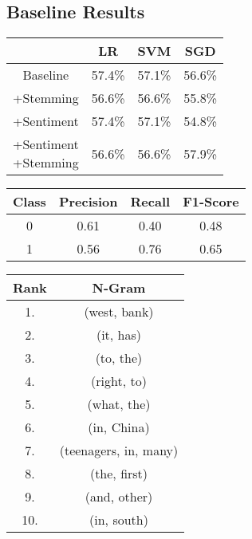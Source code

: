 \documentclass[11pt,a4paper]{article}
\begin{document}
\subsection{Baseline Results}
\begin{center}
\begin{tabular}{ |c|c|c|c| }
 \hline
  & LR & SVM & SGD \\
 \hline
 Baseline & 57.4\% & 57.1\% & 56.6\% \\
  \hline
 +Stemming & 56.6\% & 56.6\% & 55.8\% \\
  \hline
 +Sentiment & 57.4\% & 57.1\%  & 54.8\% \\
  \hline
  \shortstack{+Sentiment \\ +Stemming} & 56.6\% & 56.6\% & 57.9\% \\
 \hline
\end{tabular}
\end{center}

\begin{center}
\begin{tabular}{ |c|c|c|c| }
 \hline
  Class & Precision & Recall & F1-Score\\
  \hline
  0 & 0.61 & 0.40 & 0.48\\
  \hline
  1 & 0.56 & 0.76 & 0.65\\
 \hline
\end{tabular}
\end{center}

\begin{center}
\begin{tabular}{ |c|c| }
 \hline
 Rank & N-Gram\\
 \hline
 1. & (west, bank)\\
 2. & (it, has)\\
 3. & (to, the)\\
 4. & (right, to)\\
 5. & (what, the)\\
 6. & (in, China)\\
 7. & (teenagers, in, many)\\
 8. & (the, first)\\
 9. & (and, other)\\
 10. & (in, south)\\
 \hline
\end{tabular}
\end{center}
\end{document}
